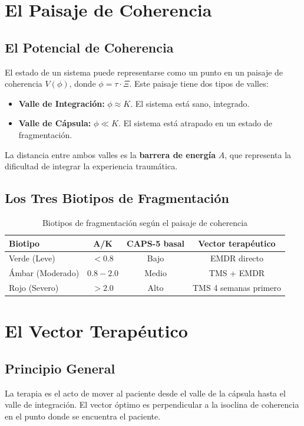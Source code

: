 \documentclass[12pt,openany]{book}
\begin{document}
\chapter{El Paisaje de Coherencia}

\section{El Potencial de Coherencia}
El estado de un sistema puede representarse como un punto en un paisaje
de coherencia $V(\phi)$, donde $\phi = \tau \cdot \Xi$. Este paisaje
tiene dos tipos de valles:

\begin{itemize}
  \item \textbf{Valle de Integración:} $\phi \approx K$. El sistema está
        sano, integrado.
  \item \textbf{Valle de Cápsula:} $\phi \ll K$. El sistema está atrapado
        en un estado de fragmentación.
\end{itemize}

La distancia entre ambos valles es la \textbf{barrera de energía} $A$,
que representa la dificultad de integrar la experiencia traumática.

\section{Los Tres Biotipos de Fragmentación}

\begin{table}[h!]
\centering
\caption{Biotipos de fragmentación según el paisaje de coherencia}
\begin{tabular}{lccc}
\toprule
\textbf{Biotipo} & \textbf{A/K} & \textbf{CAPS-5 basal} & \textbf{Vector terapéutico} \\
\midrule
Verde (Leve)      & $<0.8$  & Bajo        & EMDR directo \\
Ámbar (Moderado)  & $0.8-2.0$ & Medio      & TMS + EMDR \\
Rojo (Severo)     & $>2.0$  & Alto        & TMS 4 semanas primero \\
\bottomrule
\end{tabular}
\end{table}

\chapter{El Vector Terapéutico}

\section{Principio General}
La terapia es el acto de mover al paciente desde el valle de la cápsula
hasta el valle de integración. El vector óptimo es perpendicular a la
isoclina de coherencia en el punto donde se encuentra el paciente.
\end{document}
